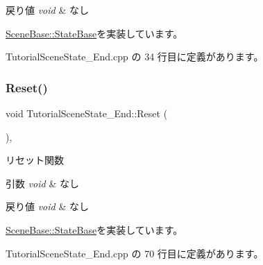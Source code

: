 \begin{DoxyRetVals}{戻り値}
{\em void} & なし \\
\hline
\end{DoxyRetVals}


\mbox{\hyperlink{class_scene_base_1_1_state_base_a33350231b039a2178c19beac0211c5b8}{Scene\+Base\+::\+State\+Base}}を実装しています。



 Tutorial\+Scene\+State\+\_\+\+End.\+cpp の 34 行目に定義があります。

\mbox{\label{class_tutorial_scene_state___end_ada1a87235a021b40f8eca96e31879227}} 
\subsubsection{\texorpdfstring{Reset()}{Reset()}}
{\footnotesize\ttfamily void Tutorial\+Scene\+State\+\_\+\+End\+::\+Reset (\begin{DoxyParamCaption}{ }\end{DoxyParamCaption})\hspace{0.3cm}{\ttfamily [override]}, {\ttfamily [virtual]}}



リセット関数 


\begin{DoxyParams}{引数}
{\em void} & なし \\
\hline
\end{DoxyParams}

\begin{DoxyRetVals}{戻り値}
{\em void} & なし \\
\hline
\end{DoxyRetVals}


\mbox{\hyperlink{class_scene_base_1_1_state_base_a2e14a3afece0b1d8db9edcebf514a977}{Scene\+Base\+::\+State\+Base}}を実装しています。



 Tutorial\+Scene\+State\+\_\+\+End.\+cpp の 70 行目に定義があります。

\mbox{\label{class_tutorial_scene_state___end_aafc0d8d042de8c7f79d84fcdc35a807c}} 
